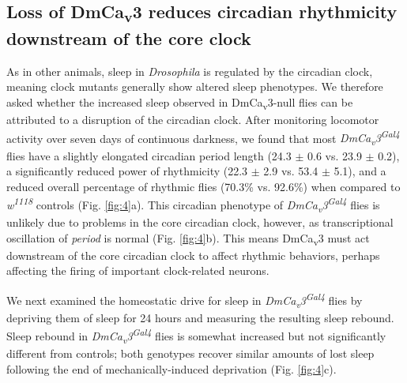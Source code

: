 \subsection*{Loss of DmCa\textsubscript{v}3 reduces circadian rhythmicity downstream of the core clock}

As in other animals, sleep in \emph{Drosophila} is regulated by the circadian clock, meaning clock mutants generally show altered sleep phenotypes\cite{hendricks:2003aa, parisky:2008aa}.
We therefore asked whether the increased sleep observed in DmCa\textsubscript{v}3-null flies can be attributed to a disruption of the circadian clock.
After monitoring locomotor activity over seven days of continuous darkness, we found that most \emph{DmCa\textsubscript{v}3\textsuperscript{Gal4}} flies have a slightly elongated circadian period length (24.3 $\pm$ 0.6 vs. 23.9 $\pm$ 0.2), a significantly reduced power of rhythmicity (22.3 $\pm$ 2.9 vs. 53.4 $\pm$ 5.1), and a reduced overall percentage of rhythmic flies (70.3\% vs. 92.6\%) when compared to \emph{w\textsuperscript{1118}} controls (Fig. \ref{fig:4}a).
This circadian phenotype of \emph{DmCa\textsubscript{v}3\textsuperscript{Gal4}} flies is unlikely due to problems in the core circadian clock, however, as transcriptional oscillation of \emph{period} is normal (Fig. \ref{fig:4}b).
This means DmCa\textsubscript{v}3 must act downstream of the core circadian clock to affect rhythmic behaviors, perhaps affecting the firing of important clock-related neurons.

We next examined the homeostatic drive for sleep in \emph{DmCa\textsubscript{v}3\textsuperscript{Gal4}} flies by depriving them of sleep for 24 hours and measuring the resulting sleep rebound. Sleep rebound in \emph{DmCa\textsubscript{v}3\textsuperscript{Gal4}} flies is somewhat increased but not significantly different from controls; both genotypes recover similar amounts of lost sleep following the end of mechanically-induced deprivation (Fig. \ref{fig:4}c).
